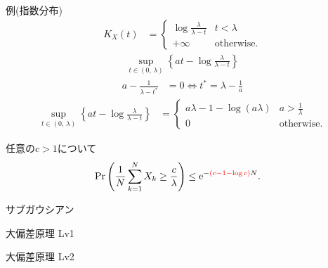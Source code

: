 \documentclass[lualatex,handout]{beamer}
\newcommand{\emm}[1]{\textcolor{red}{#1}}
\theoremstyle{definition}
\begin{document}
\begin{frame}{例(指数分布)}
\begin{align*}
K_X(t) &=
\begin{cases}
\log\frac{\lambda}{\lambda-t}& t < \lambda\\
+\infty&\text{otherwise.}
\end{cases}
\end{align*}
\begin{align*}
\sup_{t\in(0,\,\lambda)} \left\{at - \log\frac{\lambda}{\lambda-t}\right\}
\end{align*}
\begin{align*}
a - \frac1{\lambda-t^*} &=0 \iff  t^* = \lambda-\frac1a
\end{align*}
\begin{align*}
\sup_{t\in(0,\,\lambda)} \left\{at - \log\frac{\lambda}{\lambda-t}\right\}
&=\begin{cases}
a\lambda - 1 - \log(a\lambda)& a > \frac1\lambda\\
0 & \text{otherwise.}
\end{cases}
\end{align*}

\vspace{1em}
任意の$c > 1$について
\begin{align*}
\Pr\left(\frac1N\sum_{k=1}^N X_k \ge \frac{c}{\lambda}\right) &\le \mathrm{e}^{-\emm{(c-1-\log c)}N}.
\end{align*}
\end{frame}

\begin{frame}{サブガウシアン}
\end{frame}

\begin{frame}{大偏差原理 Lv1}
\begin{theorem}[クラメールの定理]
\end{theorem}
\end{frame}

\begin{frame}{大偏差原理 Lv2}
\begin{theorem}[サノフの定理]
\end{theorem}
\end{frame}
\end{document}
